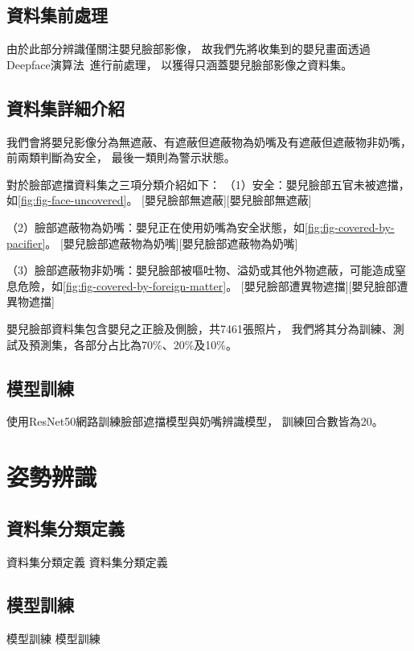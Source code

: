 \documentclass[class=NCU_thesis, crop=false]{standalone}
\begin{document}
\subsection{資料集前處理}
由於此部分辨識僅關注嬰兒臉部影像，
故我們先將收集到的嬰兒畫面透過Deepface演算法~\cite{taigmanDeepFace2014}進行前處理，
以獲得只涵蓋嬰兒臉部影像之資料集。

\subsection{資料集詳細介紹}
我們會將嬰兒影像分為無遮蔽、有遮蔽但遮蔽物為奶嘴及有遮蔽但遮蔽物非奶嘴，
前兩類判斷為安全，
最後一類則為警示狀態。

對於臉部遮擋資料集之三項分類介紹如下：
（1）安全：嬰兒臉部五官未被遮擋，如\cref{fig:fig-face-uncovered}。
[嬰兒臉部無遮蔽][嬰兒臉部無遮蔽]

（2）臉部遮蔽物為奶嘴：嬰兒正在使用奶嘴為安全狀態，如\cref{fig:fig-covered-by-pacifier}。
[嬰兒臉部遮蔽物為奶嘴][嬰兒臉部遮蔽物為奶嘴]

（3）臉部遮蔽物非奶嘴：嬰兒臉部被嘔吐物、溢奶或其他外物遮蔽，可能造成窒息危險，如\cref{fig:fig-covered-by-foreign-matter}。
[嬰兒臉部遭異物遮擋][嬰兒臉部遭異物遮擋]

嬰兒臉部資料集包含嬰兒之正臉及側臉，共7461張照片，
我們將其分為訓練、測試及預測集，各部分占比為70\%、20\%及10\%。

\subsection{模型訓練}
使用ResNet50網路訓練臉部遮擋模型與奶嘴辨識模型，
訓練回合數皆為20。

\section{姿勢辨識}
\subsection{資料集分類定義}
資料集分類定義 資料集分類定義

\subsection{模型訓練}
模型訓練 模型訓練
\end{document}

